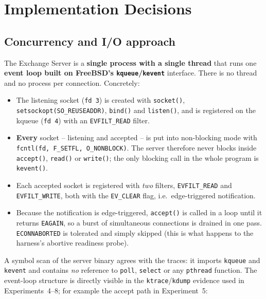 \documentclass[11pt,a4paper]{article}
\begin{document}
\section{Implementation Decisions}
\label{sec:impl}

\subsection{Concurrency and I/O approach}

The Exchange Server is a \textbf{single process with a single thread} that runs one
\textbf{event loop built on FreeBSD's \texttt{kqueue}/\texttt{kevent}} interface.  There
is no thread and no process per connection.  Concretely:

\begin{itemize}[leftmargin=1.4em,itemsep=2pt]
  \item The listening socket (\texttt{fd 3}) is created with \texttt{socket()},
        \texttt{setsockopt(SO\_REUSEADDR)}, \texttt{bind()} and \texttt{listen()}, and is
        registered on the kqueue (\texttt{fd 4}) with an \texttt{EVFILT\_READ} filter.
  \item \textbf{Every} socket -- listening and accepted -- is put into non-blocking mode
        with \texttt{fcntl(fd, F\_SETFL, O\_NONBLOCK)}.  The server therefore never
        blocks inside \texttt{accept()}, \texttt{read()} or \texttt{write()}; the only
        blocking call in the whole program is \texttt{kevent()}.
  \item Each accepted socket is registered with \emph{two} filters,
        \texttt{EVFILT\_READ} and \texttt{EVFILT\_WRITE}, both with the
        \texttt{EV\_CLEAR} flag, i.e.\ edge-triggered notification.
  \item Because the notification is edge-triggered, \texttt{accept()} is called in a
        loop until it returns \texttt{EAGAIN}, so a burst of simultaneous connections is
        drained in one pass.  \texttt{ECONNABORTED} is tolerated and simply skipped
        (this is what happens to the harness's abortive readiness probe).
\end{itemize}

A symbol scan of the server binary agrees with the traces: it imports
\texttt{kqueue} and \texttt{kevent} and contains \emph{no} reference to
\texttt{poll}, \texttt{select} or any \texttt{pthread} function.  The event-loop
structure is directly visible in the \texttt{ktrace}/\texttt{kdump} evidence used in
Experiments~4--8; for example the accept path in Experiment~5:
\end{document}
